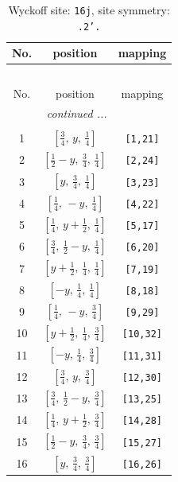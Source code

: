 \documentclass[fleqn,8pt]{jsarticle}
\begin{document}
\renewcommand{\arraystretch}{1.2}
\begin{longtable}{ccc}
\caption{Wyckoff site: {\tt 16j}, site symmetry: {\tt .2'.}}
 \\
 \hline \hline
No. & position & mapping \\ \hline \endfirsthead

\multicolumn{2}{l}{\tablename\ \thetable{}} \\
 \hline \hline
No. & position & mapping \\ \hline \endhead

 \hline \hline
\multicolumn{2}{r}{\footnotesize\it continued ...} \\ \endfoot

 \hline \hline
\multicolumn{2}{r}{} \\ \endlastfoot

1 & $\left[ \frac{3}{4},\, y,\, \frac{1}{4} \right]$ & {\tt [1,21]} \\ \hline
2 & $\left[ \frac{1}{2} - y,\, \frac{3}{4},\, \frac{1}{4} \right]$ & {\tt [2,24]} \\ \hline
3 & $\left[ y,\, \frac{3}{4},\, \frac{1}{4} \right]$ & {\tt [3,23]} \\ \hline
4 & $\left[ \frac{1}{4},\, - y,\, \frac{1}{4} \right]$ & {\tt [4,22]} \\ \hline
5 & $\left[ \frac{1}{4},\, y + \frac{1}{2},\, \frac{1}{4} \right]$ & {\tt [5,17]} \\ \hline
6 & $\left[ \frac{3}{4},\, \frac{1}{2} - y,\, \frac{1}{4} \right]$ & {\tt [6,20]} \\ \hline
7 & $\left[ y + \frac{1}{2},\, \frac{1}{4},\, \frac{1}{4} \right]$ & {\tt [7,19]} \\ \hline
8 & $\left[ - y,\, \frac{1}{4},\, \frac{1}{4} \right]$ & {\tt [8,18]} \\ \hline
9 & $\left[ \frac{1}{4},\, - y,\, \frac{3}{4} \right]$ & {\tt [9,29]} \\ \hline
10 & $\left[ y + \frac{1}{2},\, \frac{1}{4},\, \frac{3}{4} \right]$ & {\tt [10,32]} \\ \hline
11 & $\left[ - y,\, \frac{1}{4},\, \frac{3}{4} \right]$ & {\tt [11,31]} \\ \hline
12 & $\left[ \frac{3}{4},\, y,\, \frac{3}{4} \right]$ & {\tt [12,30]} \\ \hline
13 & $\left[ \frac{3}{4},\, \frac{1}{2} - y,\, \frac{3}{4} \right]$ & {\tt [13,25]} \\ \hline
14 & $\left[ \frac{1}{4},\, y + \frac{1}{2},\, \frac{3}{4} \right]$ & {\tt [14,28]} \\ \hline
15 & $\left[ \frac{1}{2} - y,\, \frac{3}{4},\, \frac{3}{4} \right]$ & {\tt [15,27]} \\ \hline
16 & $\left[ y,\, \frac{3}{4},\, \frac{3}{4} \right]$ & {\tt [16,26]} \\
\end{longtable}
\end{document}
